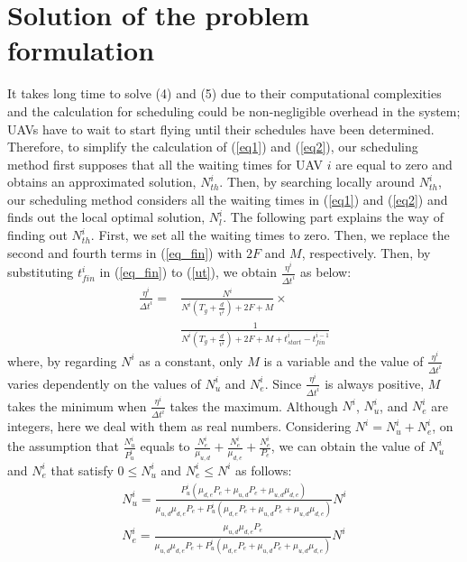\documentclass{ieeeaccess}
\begin{document}
\section{Solution of the problem formulation}\label{ape}
It takes long time to solve (4) and (5) due to their computational complexities and the calculation for scheduling could be non-negligible overhead in the system; UAVs have to wait to start flying until their schedules have been determined.
Therefore, to simplify the calculation of (\ref{eq1}) and (\ref{eq2}), our scheduling method first supposes that all the waiting times for UAV $i$ are equal to zero and obtains an approximated solution, $N_{th}^i$.
Then, by searching locally around $N_{th}^i$, our scheduling method considers all the waiting times in (\ref{eq1}) and (\ref{eq2}) and finds out the local optimal solution, $N_{l}^i$.
The following part explains the way of finding out $N_{th}^i$.
%
First, we set all the waiting times to zero.
%
Then, we replace the second and fourth terms in (\ref{eq_fin}) with $2F$ and $M$, respectively.
%
Then, by substituting ${t_{fin}^i}$ in (\ref{eq_fin}) to (\ref{ut}), we obtain $\frac{\eta^i}{{\Delta{t}}^i}$ as below:
%
\begin{align}
\frac{\eta^{i}}{{\Delta{t}}^i}
=&\frac{N^i}{N^i({T_g}+\frac{d}{v^i})+2F+M}\times\nonumber\\
&\frac{1}{N^i({T_g}+\frac{d}{v^i})+2F+M+t_{start}^i-t_{fin}^{i-1}}\label{eq4}
\end{align}
%
where, by regarding $N^i$ as a constant, only $M$ is a variable and the value of $\frac{\eta^{i}}{{\Delta{t}}^i}$ varies dependently on the values of $N_u^i$ and $N_e^i$.
%
Since $\frac{\eta^{i}}{{\Delta{t}}^i}$ is always positive,  $M$ takes the minimum when $\frac{\eta^{i}}{{\Delta{t}}^i}$ takes the maximum. 
%
Although $N^i$, $N_u^i$, and $N_e^i$ are integers, here we deal with them as real numbers.
%
Considering $N^i=N_u^i + N_e^i$, on the assumption that $\frac{N_u^i}{P_u^i}$ equals to $\frac{N_e^i}{\mu_{u,d}}+\frac{N_e^i}{\mu_{d,e}}+\frac{N_e^i}{P_e}$, we can obtain the value of $N_u^i$ and $N_e^i$ that satisfy $0\leq{N_u^i}$ and ${N_e^i}\leq{N^i}$ as follows:
%
\begin{align}
N_u^i=\frac{P_u^i(\mu_{d,e}P_e+\mu_{u,d}P_e+\mu_{u,d}\mu_{d,e})}{\mu_{u,d}\mu_{d,e}P_e+P_u^i(\mu_{d,e}P_e+\mu_{u,d}P_e+\mu_{u,d}\mu_{d,e})}N^i\label{eq5}\\
N_e^i=\frac{\mu_{u,d}\mu_{d,e}P_e}{\mu_{u,d}\mu_{d,e}P_e+P_u^i(\mu_{d,e}P_e+\mu_{u,d}P_e+\mu_{u,d}\mu_{d,e})}N^i\label{eq6}
\end{align}
\end{document}
